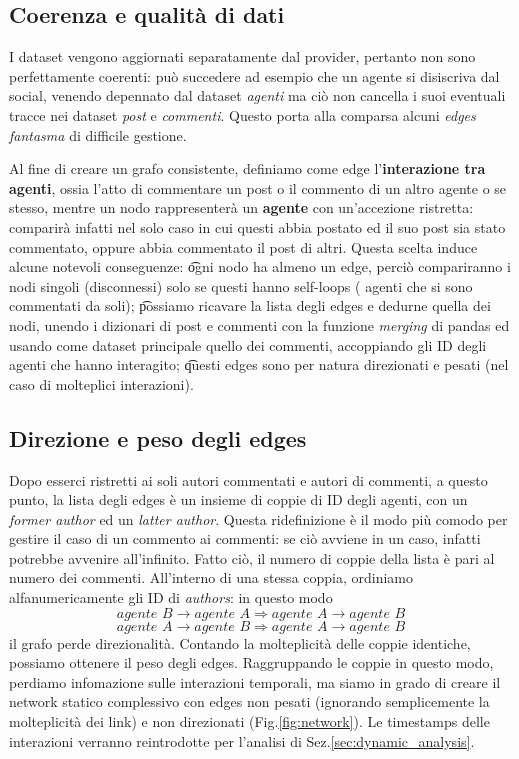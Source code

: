 \documentclass[twocolumn]{article}
\begin{document}
   \subsection{Coerenza e qualità di dati}
   I dataset vengono aggiornati separatamente dal provider, pertanto non sono perfettamente coerenti: può
   succedere ad esempio che un agente si disiscriva dal social, venendo depennato dal dataset \textit{agenti}
   ma ciò non cancella i suoi eventuali tracce nei dataset \textit{post} e \textit{commenti}.
   Questo porta alla comparsa alcuni \textit{edges fantasma} di difficile gestione.
   
   Al fine di creare un grafo consistente, definiamo come edge l'\textbf{interazione tra agenti}, ossia l'atto
   di commentare un post o il commento di un altro agente o se stesso, mentre un nodo rappresenterà un
   \textbf{agente} con un'accezione ristretta: comparirà infatti nel solo caso in cui questi abbia postato ed il suo post sia stato commentato, oppure abbia commentato il post di altri.
   Questa scelta induce alcune notevoli conseguenze:
   \t ogni nodo ha almeno un edge, perciò compariranno i nodi singoli (disconnessi) solo se questi hanno
   self-loops ( agenti che si sono commentati da soli);
   \t possiamo ricavare la lista degli edges e dedurne quella dei nodi, unendo i dizionari di post e commenti con la funzione
   \textit{merging} di pandas ed usando come dataset principale quello dei commenti, accoppiando gli ID degli agenti che hanno interagito;
   \t questi edges sono per natura direzionati e pesati (nel caso di molteplici interazioni).
   
   \subsection{Direzione e peso degli edges}
   Dopo esserci ristretti ai soli autori commentati e autori di commenti, a questo punto, la lista degli edges è un insieme di
   coppie di ID degli agenti, con un \textit{former author} ed un \textit{latter author}.
   Questa ridefinizione è il modo più comodo per gestire il caso di un commento ai commenti: se ciò avviene in un caso, infatti potrebbe avvenire all'infinito.
   Fatto ciò, il numero di coppie della lista è pari al numero dei commenti.
   All'interno di una stessa coppia, ordiniamo alfanumericamente gli ID di \textit{authors}: in questo modo
   \[ \textit{agente B}\rightarrow\textit{agente A} \Rightarrow \textit{agente A}\rightarrow\textit{agente B} \]
   \[ \textit{agente A}\rightarrow\textit{agente B} \Rightarrow \textit{agente A}\rightarrow\textit{agente B} \]
   il grafo perde direzionalità.
   Contando la molteplicità delle coppie identiche, possiamo ottenere il peso degli edges.
   Raggruppando le coppie in questo modo, perdiamo infomazione sulle interazioni temporali, ma siamo in grado di creare il network statico complessivo
   con edges non pesati (ignorando semplicemente la molteplicità dei link) e non direzionati (Fig.\ref{fig:network}).
   Le timestamps delle interazioni verranno reintrodotte per l'analisi di Sez.\ref{sec:dynamic_analysis}.
   
\end{document}
